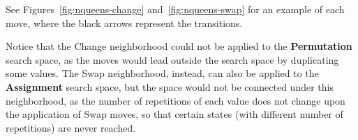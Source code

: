 See Figures~\ref{fig:nqueens-change} and~\ref{fig:nqueens-swap} for an example of each move, where the black arrows represent the transitions.

\begin{figure}
  \subfigures 
  \begin{minipage}{\textwidth}
    \hspace{\fill}
  \end{minipage}
\end{figure}


Notice that the \textsf{Change} neighborhood could not be applied to
the \textbf{Permutation} search space, as the moves would lead outside
the search space by duplicating some values. The \textsf{Swap}
neighborhood, instead, can also be applied to the \textbf{Assignment}
search space, but the space would not be connected under this
neighborhood, as the number of repetitions of each value does not
change upon the application of \textsf{Swap} moves, so that certain
states (with different number of repetitions) are never reached.

